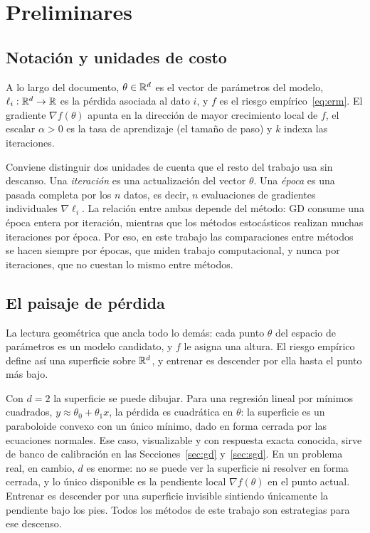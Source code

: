 \section{Preliminares}\label{sec:preliminares}

\subsection{Notación y unidades de costo}

A lo largo del documento, $\theta \in \mathbb{R}^d$ es el vector de parámetros del modelo, $\ell_i : \mathbb{R}^d \to \mathbb{R}$ es la pérdida asociada al dato $i$, y $f$ es el riesgo empírico~\eqref{eq:erm}. El gradiente $\nabla f(\theta)$ apunta en la dirección de mayor crecimiento local de $f$, el escalar $\alpha > 0$ es la tasa de aprendizaje (el tamaño de paso) y $k$ indexa las iteraciones.

Conviene distinguir dos unidades de cuenta que el resto del trabajo usa sin descanso. Una \emph{iteración} es una actualización del vector $\theta$. Una \emph{época} es una pasada completa por los $n$ datos, es decir, $n$ evaluaciones de gradientes individuales $\nabla\ell_i$. La relación entre ambas depende del método: GD consume una época entera por iteración, mientras que los métodos estocásticos realizan muchas iteraciones por época. Por eso, en este trabajo las comparaciones entre métodos se hacen siempre por épocas, que miden trabajo computacional, y nunca por iteraciones, que no cuestan lo mismo entre métodos.

\subsection{El paisaje de pérdida}

La lectura geométrica que ancla todo lo demás: cada punto $\theta$ del espacio de parámetros es un modelo candidato, y $f$ le asigna una altura. El riesgo empírico define así una superficie sobre $\mathbb{R}^d$, y entrenar es descender por ella hasta el punto más bajo.

Con $d = 2$ la superficie se puede dibujar. Para una regresión lineal por mínimos cuadrados, $y \approx \theta_0 + \theta_1 x$, la pérdida es cuadrática en $\theta$: la superficie es un paraboloide convexo con un único mínimo, dado en forma cerrada por las ecuaciones normales. Ese caso, visualizable y con respuesta exacta conocida, sirve de banco de calibración en las Secciones~\ref{sec:gd} y~\ref{sec:sgd}. En un problema real, en cambio, $d$ es enorme: no se puede ver la superficie ni resolver en forma cerrada, y lo único disponible es la pendiente local $\nabla f(\theta)$ en el punto actual. Entrenar es descender por una superficie invisible sintiendo únicamente la pendiente bajo los pies. Todos los métodos de este trabajo son estrategias para ese descenso.
